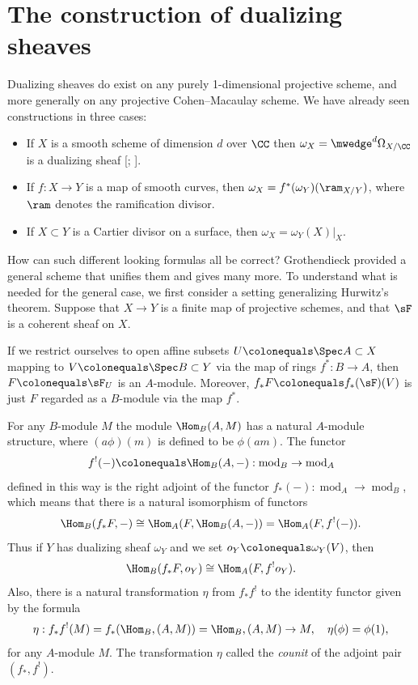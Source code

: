 \section{The construction of dualizing sheaves}
\label{dualizing sheaves section}

Dualizing sheaves do exist on any purely 1-dimensional projective scheme, 
and more generally on any projective Cohen--Macaulay scheme. We
have already seen constructions
in three
cases:

\begin{itemize}
\item If $X$ is a smooth scheme of dimension $d$ over $\CC$ then
$\omega_{X}= \mwedge^{d} \Omega_{X/\CC}$
is a dualizing sheaf
%
[;
\citeyear[p.~648, 708]{Griffiths-Harris1978}].
\item If $f: X\to Y$ is a map of smooth curves, then $\omega_{X} =
f^{*}(\omega_{Y})(\ram_{X/Y})$, where
$\ram$ denotes the
ramification divisor.
%
\item If $X\subset Y$ is a
Cartier divisor
%
on a surface, then $\omega_{X}
= \omega_{Y}(X)|_{X}$.
\end{itemize}

How can such different looking formulas all be correct?
Grothendieck
%
provided a general scheme
that unifies them and gives many more.
To understand what is needed for the general case, we first consider a
setting generalizing
Hurwitz's theorem.
%
Suppose that $X\to Y$ is a
finite map
%
of projective schemes, and that
$\sF$ is a coherent sheaf on $X$.

If we restrict ourselves to open affine subsets
$U \colonequals \Spec A\subset X$ mapping to
$V\colonequals \Spec B\subset Y$ via the map of rings $f^{*}:B\to A$, then
$F \colonequals \sF_{U}$ is an $A$-module. Moreover,
$f_*{F} \colonequals f_*(\sF)(V)$ is just $F$ regarded as a $B$-module
via the map $f^{*}$.

For any $B$-module $M$ the module $\Hom_{B}(A, M)$ has a natural
$A$-module structure,
where $(a\phi)(m)$ is defined to be $\phi(am)$. The functor
%
$$
f^!(-)\colonequals\Hom_{B}(A,-):\operatorname{mod}_B\to\operatorname{mod}_A
$$
defined in this way is the
%
right adjoint of the functor
$f_{*}(-):\operatorname{mod}_{A}\to \operatorname{mod}_{B}$,
which means that there is a natural isomorphism of functors
$$
\Hom_{B}(f_{*}F, -) \cong \Hom_{A}(F, \Hom_{B}(A, -)) = \Hom_{A}(F, f^{!}(-)).
$$
Thus
if $Y$ has dualizing sheaf $\omega_Y$ and we set
$o_Y \colonequals \omega_Y(V)$, then
$$
\Hom_{B}(f_{*}F, o_{Y}) \cong \Hom_{A}(F, f^{!}o_{Y}).
$$
Also, there is a natural transformation $\eta$ from $ f_{*}f^{!}$ to
the identity functor given by the formula
$$
\eta: f_{*}f^{!}(M) = f_{*}(\Hom_{B}, (A,M)) = \Hom_{B}, (A,M) \to M,
\quad\eta(\phi) = \phi(1),
$$
for any $A$-module $M$.
The transformation $\eta$ called the
%
%
\emph{counit} of the adjoint pair
$(f_{*}, f^{!})$.

